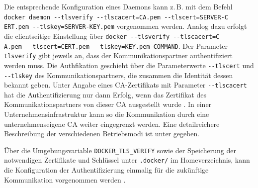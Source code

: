\documentclass[../main.tex]{subfiles}
\begin{document}
    Die entsprechende Konfiguration eines Daemons kann z.\,B. mit dem Befehl \texttt{docker daemon -{}-tlsverify -{}-tlscacert=CA.pem -{}-tlscert=SERVER-C}\\ \texttt{ERT.pem -{}-tlskey=SERVER-KEY.pem} vorgenommen werden. Analog dazu erfolgt die clientseitige Einstellung über \texttt{docker -{}-tlsverify -{}-tlscacert=C}\\ \texttt{A.pem -{}-tlscert=CERT.pem -{}-tlskey=KEY.pem COMMAND}. Der Parameter \texttt{-{}-tlsverify} gibt jeweils an, dass der Kommunikationspartner authentifiziert werden muss. Die Authfikation geschieht über die Parameterwerte \texttt{-{}-tlscert} und \texttt{-{}-tlskey} des Kommunikationspartners, die zusammen die Identität dessen bekannt geben. Unter Angabe eines \acrshort{CA}-Zertifikats mit Parameter \texttt{-{}-tlscacert} hat die Authentifizierung nur dann Erfolg, wenn das Zertifikat des Kommunikationspartners von dieser \acrshort{CA} ausgestellt wurde \cite{dockerSecurityHTTPS}. In einer Unternehmensinfrastruktur kann so die Kommunikation durch eine unternehmenseigene CA weiter eingegrenzt werden. Eine detailreichere Beschreibung der verschiedenen Betriebsmodi ist unter \cite{dockerSecurityHTTPS} gegeben.

    Über die Umgebungsvariable \texttt{DOCKER\_TLS\_VERIFY} sowie der Speicherung der notwendigen Zertifikate und Schlüssel unter \texttt{.docker/} im Homeverzeichnis, kann die Konfiguration der Authentifizierung einmalig für die zukünftige Kommunikation vorgenommen werden \cite{dockerSecurityHTTPS}.



\end{document}
